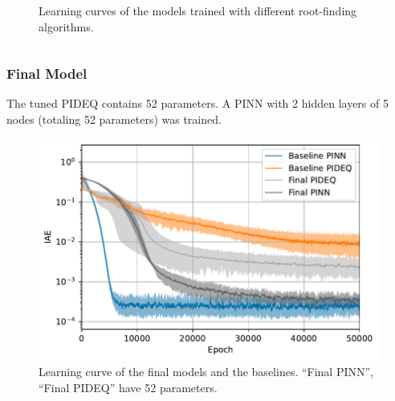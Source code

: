 \documentclass[t]{beamer}
\begin{document}
\begin{frame}
\begin{columns}[c]
\begin{column}{.6\textwidth}
{\begin{figure}[h]
            \caption{Learning curves of the models trained with different root-finding algorithms.}
            \label{fig:solver-iae}
	\end{figure}}
    \end{column}
    \end{columns}
\end{frame}

\begin{frame}
    \frametitle{Final Model}
    The tuned PIDEQ contains 52 parameters. A PINN with 2 hidden layers of 5 nodes (totaling 52 parameters) was trained.
    \begin{figure}[h]
	\centering
	\includegraphics[width=.6\textwidth]{../images/final_iae.pdf}
	\caption{Learning curve of the final models and the baselines. ``Final PINN'', ``Final PIDEQ'' have 52 parameters.}
	\label{fig:final-iae}
    \end{figure}
\end{frame}
\end{document}
